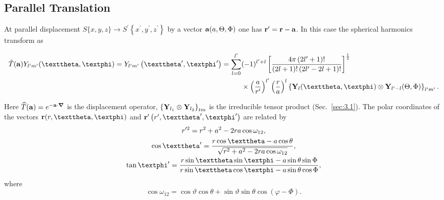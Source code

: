 \subsection{Parallel Translation}\label{sec:5.5.3}
At parallel displacement $S\{x, y, z\} \rightarrow S^{\prime}\left\{x^{\prime}, y^{\prime}, z^{\prime}\right\}$ by a vector $\mathbf{a}(a, \Theta, \Phi)$ one has $\mathbf{r}^{\prime}=\mathbf{r}-\mathbf{a}$. In this case the spherical harmonics transform as
\begin{corrected}
\begin{align}
\hat{T}(\vect{a}) Y_{l^{\prime} m^{\prime}}(\vartheta, \varphi)=Y_{l^{\prime} m^{\prime}}\left(\vartheta^{\prime}, \varphi^{\prime}\right)=\sum_{l=0}^{l^{\prime}} & (-1)^{l^{\prime}+l}\left[\frac{4 \pi\left(2 l^{\prime}+1\right)!}{(2 l+1)!\left(2 l^{\prime}-2 l+1\right)!}\right]^{\frac{1}{2}}  \notag\\
& \times\left(\frac{a}{r^{\prime}}\right)^{l^{\prime}}\left(\frac{r}{a}\right)^{l}\left\{\vect{Y}_{l}(\vartheta, \varphi) \otimes \vect{Y}_{l^{\prime}-l}(\Theta, \Phi)\right\}_{l^{\prime} m^{\prime}}. \label{eq:5:5:3}
\end{align}
\end{corrected}
Here $\widehat{T}(\mathbf{a})=e^{-\mathbf{a} \cdot \boldsymbol \nabla}$ is the displacement operator, $\left\{\mathbf{Y}_{l_{1}} \otimes \mathbf{Y}_{l_{2}}\right\}_{t m}$ is the irreducible tensor product (Sec.~\ref{sec:3.1}). The polar coordinates of the vectors $\vect{r}(r, \vartheta, \varphi)$ and $\vect{r}^{\prime}\left(r^{\prime}, \vartheta^{\prime}, \varphi^{\prime}\right)$ are related by
\begin{gather}
r^{\prime 2}=r^{2}+a^{2}-2 r a \cos \omega_{12} , \notag\\
\cos \vartheta^{\prime}=\frac{r \cos \vartheta-a \cos \theta}{\sqrt{r^{2}+a^{2}-2 r a \cos \omega_{12}}},  \label{eq:5:5:4}\\
\tan \varphi^{\prime}=\frac{r \sin \vartheta \sin \varphi-a \sin \theta \sin \Phi}{r \sin \vartheta \cos \varphi-a \sin \theta \cos \Phi}, \notag
\end{gather}
where
\begin{equation}
\cos \omega_{12}=\cos \vartheta \cos \theta+\sin \vartheta \sin \theta \cos (\varphi-\Phi) . \label{eq:5:5:5}
\end{equation}
